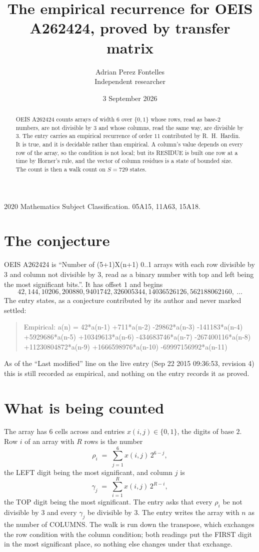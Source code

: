 \documentclass[11pt,a4paper]{article}
\title{The empirical recurrence for OEIS A262424, proved by transfer matrix}
\author{Adrian Perez Fontelles\\ \small Independent researcher}
\date{3 September 2026}
\theoremstyle{plain}
\theoremstyle{definition}
\begin{document}
\maketitle

\begin{abstract}
OEIS A262424 counts arrays of width $6$ over $\{0,1\}$ whose rows, read as base-$2$
numbers, are not divisible by $3$ and whose columns, read the same way, are divisible by
$3$. The entry carries an empirical recurrence of order $11$ contributed by
R.~H.~Hardin. It is true, and it is decidable rather than empirical. A column's value depends on
every row of the array, so the condition is not local; but its RESIDUE is built one row at a
time by Horner's rule, and the vector of column residues is a state of bounded size. The count
is then a walk count on $S=729$ states.
\end{abstract}

\noindent\small 2020 Mathematics Subject Classification. 05A15, 11A63, 15A18.\normalsize

\section{The conjecture}

OEIS A262424 is ``Number of (5+1)X(n+1) 0..1 arrays with each row divisible by 3 and column not divisible by 3, read as a binary number with top and left being the most significant bits.''. It has offset $1$ and begins
\[
42, 144, 10206, 200880, 9401742, 326005344, 14036526126, 562188062160,\ \dots
\]
The entry states, as a conjecture contributed by its author and never marked settled:
\begin{quote}
Empirical: a(n) = 42*a(n-1) +711*a(n-2) -29862*a(n-3) -141183*a(n-4) +5929686*a(n-5) +10349613*a(n-6) -434683746*a(n-7) -267400116*a(n-8) +11230804872*a(n-9) +1666598976*a(n-10) -69997156992*a(n-11)
\end{quote}
As of the ``Last modified'' line on the live entry (Sep 22 2015 09:36:53, revision 4) this is still
recorded as empirical, and nothing on the entry records it as proved.

\section{What is being counted}

The array has $6$ cells across and entries $x(i,j)\in\{0,1\}$, the digits of
base $2$. Row $i$ of an array with $R$ rows is the number
\[
\rho_i\;=\;\sum_{j=1}^{6}x(i,j)\,2^{6-j} ,
\]
the LEFT digit being the most significant, and column $j$ is
\[
\gamma_j\;=\;\sum_{i=1}^{R}x(i,j)\,2^{R-i} ,
\]
the TOP digit being the most significant. The entry asks that every $\rho_i$ be not divisible by
$3$ and every $\gamma_j$ be divisible by $3$. The entry writes the array with $n$ as the number of COLUMNS. The walk is run down the transpose, which exchanges the row condition with the column condition; both readings put the FIRST digit in the most significant place, so nothing else changes under that exchange.
\end{document}
